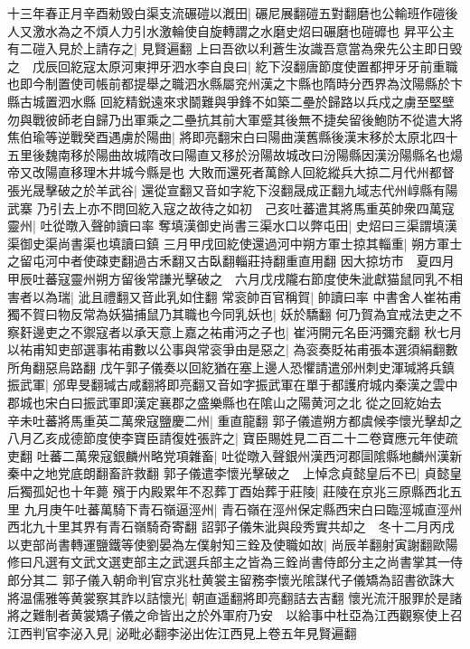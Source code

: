 十三年春正月辛酉勑毁白渠支流碾磑以漑田|{
	碾尼展翻磑五對翻磨也公輸班作磑後人又激水為之不煩人力引水激輪使自旋轉謂之水磨史炤曰碾磨也磑䃺也}
昇平公主有二磑入見於上請存之|{
	見賢遍翻}
上曰吾欲以利蒼生汝識吾意當為衆先公主即日毁之　戊辰回紇寇太原河東押牙泗水李自良曰|{
	紇下沒翻唐節度使置都押牙牙前重職也即今制置使司帳前都提舉之職泗水縣屬兖州漢之卞縣也隋時分西界為汶陽縣於卞縣古城置泗水縣}
回紇精鋭遠來求鬬難與爭鋒不如築二壘於歸路以兵戍之虜至堅壁勿與戰彼師老自歸乃出軍乘之二壘抗其前大軍蹙其後無不捷矣留後鮑防不從遣大將焦伯瑜等逆戰癸酉遇虜於陽曲|{
	將即亮翻宋白曰陽曲漢舊縣後漢末移於太原北四十五里後魏南移於陽曲故城隋改曰陽直又移於汾陽故城改曰汾陽縣因漢汾陽縣名也煬帝又改陽直移理木井城今縣是也}
大敗而還死者萬餘人回紇縱兵大掠二月代州都督張光晟擊破之於羊武谷|{
	還從宣翻又音如字紇下沒翻晟成正翻九域志代州崞縣有陽武寨}
乃引去上亦不問回紇入寇之故待之如初　己亥吐蕃遣其將馬重英帥衆四萬寇靈州|{
	吐從暾入聲帥讀曰率}
奪填漢御史尚書三渠水口以弊屯田|{
	史炤曰三渠謂填漢渠御史渠尚書渠也填讀曰鎮}
三月甲戌回紇使還過河中朔方軍士掠其輜重|{
	朔方軍士之留屯河中者使疎吏翻過古禾翻又古臥翻輜莊持翻重直用翻}
因大掠坊市　夏四月甲辰吐蕃寇靈州朔方留後常謙光擊破之　六月戊戌隴右節度使朱泚獻猫鼠同乳不相害者以為瑞|{
	泚且禮翻又音此乳如住翻}
常衮帥百官稱賀|{
	帥讀曰率}
中書舍人崔祐甫獨不賀曰物反常為妖猫捕鼠乃其職也今同乳妖也|{
	妖於驕翻}
何乃賀為宜戒法吏之不察姧邊吏之不禦寇者以承天意上嘉之祐甫沔之子也|{
	崔沔開元名臣沔彌兖翻}
秋七月以祐甫知吏部選事祐甫數以公事與常衮爭由是惡之|{
	為衮奏貶祐甫張本選須絹翻數所角翻惡烏路翻}
戊午郭子儀奏以回紇猶在塞上邊人恐懼請遣邠州刺史渾瑊將兵鎮振武軍|{
	邠卑旻翻瑊古咸翻將即亮翻又音如字振武軍在單于都護府城内秦漢之雲中郡城也宋白曰振武軍即漢定襄郡之盛樂縣也在隂山之陽黄河之北}
從之回紇始去　辛未吐蕃將馬重英二萬衆寇鹽慶二州|{
	重直龍翻}
郭子儀遣朔方都虞候李懷光擊却之　八月乙亥成德節度使李寶臣請復姓張許之|{
	寶臣賜姓見二百二十二卷寶應元年使疏吏翻}
吐蕃二萬衆寇銀麟州略党項雜畜|{
	吐從暾入聲銀州漢西河郡圁隂縣地麟州漢新秦中之地党底朗翻畜許救翻}
郭子儀遣李懷光擊破之　上悼念貞懿皇后不已|{
	貞懿皇后獨孤妃也十年薨}
殯于内殿累年不忍葬丁酉始葬于莊陵|{
	莊陵在京兆三原縣西北五里}
九月庚午吐蕃萬騎下青石嶺逼涇州|{
	青石嶺在涇州保定縣西宋白曰臨涇城直涇州西北九十里其界有青石嶺騎奇寄翻}
詔郭子儀朱泚與段秀實共却之　冬十二月丙戌以吏部尚書轉運鹽鐵等使劉晏為左僕射知三銓及使職如故|{
	尚辰羊翻射寅謝翻歐陽修曰凡選有文武文選吏部主之武選兵部主之皆為三銓尚書侍郎分主之尚書掌其一侍郎分其二}
郭子儀入朝命判官京兆杜黄裳主留務李懷光隂謀代子儀矯為詔書欲誅大將温儒雅等黄裳察其詐以詰懷光|{
	朝直遥翻將即亮翻詰去吉翻}
懷光流汗服罪於是諸將之難制者黄裳矯子儀之命皆出之於外軍府乃安　以給事中杜亞為江西觀察使上召江西判官李泌入見|{
	泌毗必翻李泌出佐江西見上卷五年見賢遍翻}
